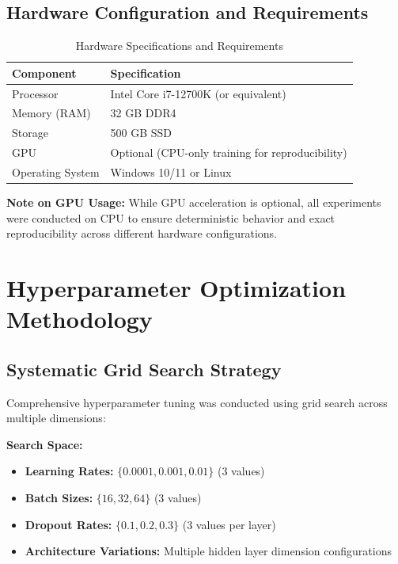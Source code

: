 \subsection{Hardware Configuration and Requirements}

\begin{table}[h]
\centering
\caption{Hardware Specifications and Requirements}
\label{tab:hardware}
\begin{tabular}{ll}
\toprule
\textbf{Component} & \textbf{Specification} \\
\midrule
Processor & Intel Core i7-12700K (or equivalent) \\
Memory (RAM) & 32 GB DDR4 \\
Storage & 500 GB SSD \\
GPU & Optional (CPU-only training for reproducibility) \\
Operating System & Windows 10/11 or Linux \\
\bottomrule
\end{tabular}
\end{table}

\textbf{Note on GPU Usage:} While GPU acceleration is optional, all experiments were conducted on CPU to ensure deterministic behavior and exact reproducibility across different hardware configurations.

\section{Hyperparameter Optimization Methodology}

\subsection{Systematic Grid Search Strategy}

Comprehensive hyperparameter tuning was conducted using grid search across multiple dimensions:

\textbf{Search Space:}
\begin{itemize}
\item \textbf{Learning Rates:} $\{0.0001, 0.001, 0.01\}$ (3 values)
\item \textbf{Batch Sizes:} $\{16, 32, 64\}$ (3 values)
\item \textbf{Dropout Rates:} $\{0.1, 0.2, 0.3\}$ (3 values per layer)
\item \textbf{Architecture Variations:} Multiple hidden layer dimension configurations
\end{itemize}

